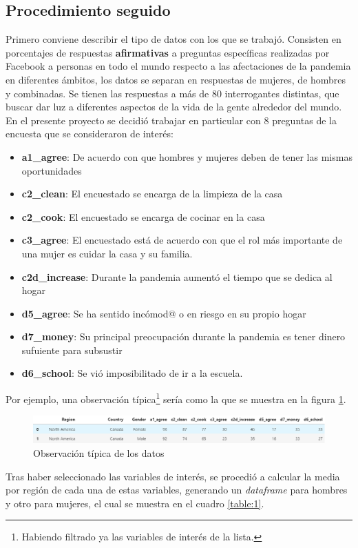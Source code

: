 \documentclass[12pt]{article}
\begin{document}
\subsection{Procedimiento seguido}
Primero conviene describir el tipo de datos con los que se trabajó. Consisten en porcentajes de respuestas \textbf{afirmativas} a preguntas específicas realizadas por Facebook a personas en todo el mundo respecto a las afectaciones de la pandemia en diferentes ámbitos, los datos se separan en respuestas de mujeres, de hombres y combinadas. Se tienen las respuestas a más de 80 interrogantes distintas, que buscar dar luz a diferentes aspectos de la vida de la gente alrededor del mundo. En el presente proyecto se decidió trabajar en particular con  8 preguntas de la encuesta que se consideraron de interés:
\begin{itemize}
    \item \textbf{a1\_agree}: De acuerdo con que hombres y mujeres deben de tener las mismas oportunidades
    \item \textbf{c2\_clean}: El encuestado se encarga de la limpieza de la casa
    \item \textbf{c2\_cook}: El encuestado se encarga de cocinar en la casa
    \item \textbf{c3\_agree}: El encuestado está de acuerdo con que el rol más importante de una mujer es cuidar la casa y su familia.
    \item \textbf{c2d\_increase}: Durante la pandemia aumentó el tiempo que se dedica al hogar
    \item \textbf{d5\_agree}: Se ha sentido incómod@ o en riesgo en su propio hogar
    \item \textbf{d7\_money}: Su principal preocupación durante la pandemia es tener dinero sufuiente para subsustir
    \item \textbf{d6\_school}: Se vió imposibilitado de ir a la escuela.
\end{itemize}
Por ejemplo, una observación típica\footnote{Habiendo filtrado ya las variables de interés de la lista.} sería como la que se muestra en la figura \ref{fig:2_1}.
\begin{figure}[H]
    \centering
    \includegraphics[width=0.9\linewidth]{images/2_1.PNG}
    \caption{Observación típica de los datos}
    \label{fig:2_1}
\end{figure}
Tras haber seleccionado las variables de interés, se procedió a calcular la media por región de cada una de estas variables, generando un \textit{dataframe} para hombres y otro para mujeres, el cual se muestra en el cuadro \ref{table:1}.
\end{document}
